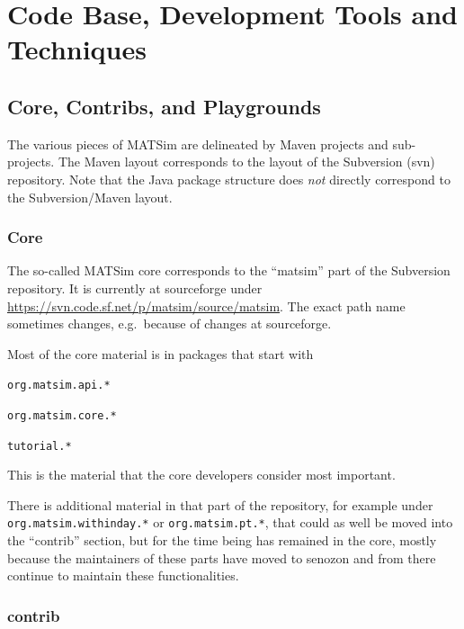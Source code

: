 \section{Code Base, Development Tools and Techniques}

\subsection{Core, Contribs, and Playgrounds}

The various pieces of MATSim are delineated by Maven \citep{...} projects and sub-projects.  The Maven layout corresponds to the layout of the Subversion (svn) repository.  Note that the Java package structure does \emph{not} directly correspond to the Subversion/Maven layout.

\subsubsection{Core}

The so-called MATSim core corresponds to the ``matsim'' part of the Subversion repository.  It is currently at \gls{sourceforge} under \url{https://svn.code.sf.net/p/matsim/source/matsim}. The exact path name sometimes changes, e.g.\ because of changes at \gls{sourceforge}.

Most of the core material is in packages that start with
\begin{compactitem}
\item \lstinline{org.matsim.api.*}
\item \lstinline{org.matsim.core.*}
\item \lstinline{tutorial.*}
\end{compactitem}
This is the material that the core developers consider most important. 

There is additional material in that part of the repository, for example under \lstinline{org.matsim.withinday.*} or \lstinline{org.matsim.pt.*}, that could as well be moved into the ``contrib'' section, but for the time being has remained in the core, mostly because the maintainers of these parts have moved to \acrshort{senozon} and from there continue to maintain these functionalities.

\subsubsection{contrib}

